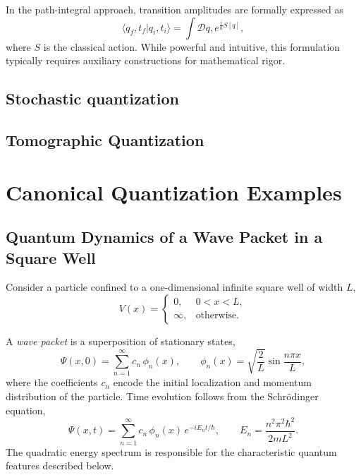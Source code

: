 In the path-integral approach, transition amplitudes are formally expressed as
\begin{equation}
\langle q_f,t_f | q_i,t_i \rangle = \int \mathcal{D}q, e^{\frac{i}{\hbar}S[q]},
\end{equation}
where $S$ is the classical action. While powerful and intuitive, this formulation typically requires auxiliary constructions for mathematical rigor.

\subsection{Stochastic quantization}
\label{stochastic-quantization}

\subsection{Tomographic Quantization}
\label{tomographic-quantization}

\section{Canonical Quantization Examples}
\label{cqe}
\subsection{Quantum Dynamics of a Wave Packet in a Square Well}

Consider a particle confined to a one-dimensional infinite square well of width $L$,
\begin{equation}
V(x) = 
\begin{cases}
0, & 0 < x < L,\\
\infty, & \text{otherwise}.
\end{cases}
\end{equation}

A \emph{wave packet} is a superposition of stationary states,
\begin{equation}
\Psi(x,0) = \sum_{n=1}^{\infty} c_n \, \phi_n(x), 
\qquad
\phi_n(x) = \sqrt{\frac{2}{L}} \sin \frac{n \pi x}{L},
\end{equation}
where the coefficients $c_n$ encode the initial localization and momentum distribution of the particle.  
Time evolution follows from the Schr\"odinger equation,
\begin{equation}
\Psi(x,t) = \sum_{n=1}^{\infty} c_n \, \phi_n(x) \, e^{-i E_n t/\hbar}, 
\qquad
E_n = \frac{n^2 \pi^2 \hbar^2}{2 m L^2}.
\end{equation}
The quadratic energy spectrum is responsible for the characteristic quantum features described below.


